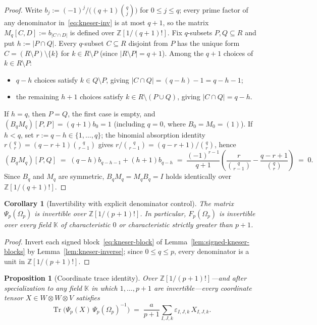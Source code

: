 \documentclass[11pt,reqno]{amsart}
\newtheorem{proposition}[theorem]{Proposition}
\newtheorem{corollary}[theorem]{Corollary}
\theoremstyle{definition}
\theoremstyle{remark}
\numberwithin{equation}{section}
\newcommand{\KK}{\mathbb{K}}
\newcommand{\ZZ}{\mathbb{Z}}
\DeclareMathOperator{\Tr}{Tr}
\begin{document}
\begin{proof}
Write $b_j := (-1)^j / \bigl((q + 1)\binom{q}{j}\bigr)$ for $0 \le j \le q$; every prime factor of any denominator in~\eqref{eq:kneser-inv} is at most $q + 1$, so the matrix $M_q[C, D] := b_{|C \cap D|}$ is defined over $\ZZ[1/(q+1)!]$. Fix $q$-subsets $P, Q \subseteq R$ and put $h := |P \cap Q|$. Every $q$-subset $C \subseteq R$ disjoint from $P$ has the unique form $C = (R \setminus P) \setminus \{k\}$ for $k \in R \setminus P$ (since $|R \setminus P| = q + 1$). Among the $q + 1$ choices of $k \in R \setminus P$:
\begin{itemize}[leftmargin=2em]
  \item $q - h$ choices satisfy $k \in Q \setminus P$, giving $|C \cap Q| = (q - h) - 1 = q - h - 1$;
  \item the remaining $h + 1$ choices satisfy $k \in R \setminus (P \cup Q)$, giving $|C \cap Q| = q - h$.
\end{itemize}
If $h = q$, then $P = Q$, the first case is empty, and $(B_q M_q)[P, P] = (q + 1) b_0 = 1$ (including $q = 0$, where $B_0 = M_0 = (1)$). If $h < q$, set $r := q - h \in \{1, \dots, q\}$; the binomial absorption identity $r\binom{q}{r} = (q - r + 1)\binom{q}{r - 1}$ gives $r / \binom{q}{r - 1} = (q - r + 1) / \binom{q}{r}$, hence
\[
  (B_q M_q)[P, Q] \;=\; (q - h) b_{q - h - 1} + (h + 1) b_{q - h}
  \;=\; \frac{(-1)^{r-1}}{q + 1}\left(\frac{r}{\binom{q}{r - 1}} - \frac{q - r + 1}{\binom{q}{r}}\right) \;=\; 0.
\]
Since $B_q$ and $M_q$ are symmetric, $B_q M_q = M_q B_q = I$ holds identically over $\ZZ[1/(q+1)!]$.
\end{proof}

\begin{corollary}[Invertibility with explicit denominator control]\label{cor:psi-invertible}
The matrix $\Psi_p(\Omega_p)$ is invertible over $\ZZ[1/(p + 1)!]$. In particular, $F_p(\Omega_p)$ is invertible over every field $\KK$ of characteristic $0$ or characteristic strictly greater than $p + 1$.
\end{corollary}

\begin{proof}
Invert each signed block~\eqref{eq:kneser-block} of Lemma~\ref{lem:signed-kneser-blocks} by Lemma~\ref{lem:kneser-inverse}; since $0 \le q \le p$, every denominator is a unit in $\ZZ[1/(p+1)!]$.
\end{proof}

\begin{proposition}[Coordinate trace identity]\label{prop:coord-trace}
Over $\ZZ[1/(p + 1)!]$---and after specialization to any field $\KK$ in which $1, \dots, p + 1$ are invertible---every coordinate tensor $X \in W \otimes W \otimes V$ satisfies
\begin{equation}\label{eq:coord-trace}
  \Tr\bigl(\Psi_p(X)\,\Psi_p(\Omega_p)^{-1}\bigr) \;=\; \frac{a}{p + 1}\sum_{I, J, k} \varepsilon_{I,J,k}\, X_{I,J,k}.
\end{equation}
\end{proposition}
\end{document}
